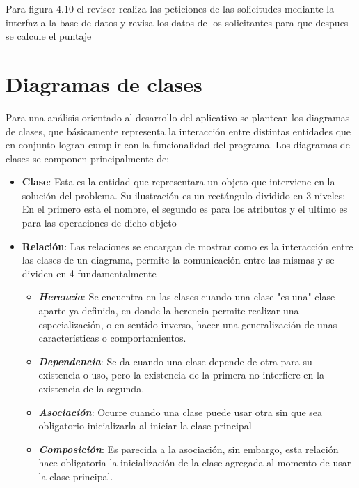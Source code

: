 Para figura 4.10 el revisor realiza las peticiones de las solicitudes mediante la interfaz a la base de datos y revisa los datos de los solicitantes para que despues se calcule el puntaje 

\newpage

\section{Diagramas de clases}

Para una análisis orientado al desarrollo del aplicativo se plantean los diagramas de clases, que básicamente representa la interacción entre distintas entidades que en conjunto logran cumplir con la funcionalidad del programa. Los diagramas de clases se componen principalmente de:

\begin{itemize}
	\item  \textbf{Clase}: Esta es la entidad que representara un objeto que interviene en la solución del problema. Su ilustración es un rectángulo dividido en 3 niveles: En el primero esta el nombre, el segundo es para los atributos y el ultimo es para las operaciones de dicho objeto
	\item \textbf{Relación}: Las relaciones se encargan de mostrar como es la interacción entre las clases de un diagrama, permite la comunicación entre las mismas y se dividen en 4 fundamentalmente
	
	
	\begin{itemize}
		\item \textit{\textbf{Herencia}}: Se encuentra en las clases cuando una clase "es una" clase aparte ya definida, en donde la herencia permite realizar una especialización, o en sentido inverso, hacer una generalización de unas características o comportamientos.
		\item \textit{\textbf{Dependencia}}: Se da cuando una clase depende de otra para su existencia o uso, pero la existencia de la primera no interfiere en la existencia de la segunda.
		\item \textit{\textbf{Asociación}}: Ocurre cuando una clase puede usar otra sin que sea obligatorio inicializarla al iniciar la clase principal
		\item \textit{\textbf{Composición}}: Es parecida a la asociación, sin embargo, esta relación hace obligatoria la inicialización de la clase agregada al momento de usar la clase principal.
	\end{itemize}
\end{itemize}

